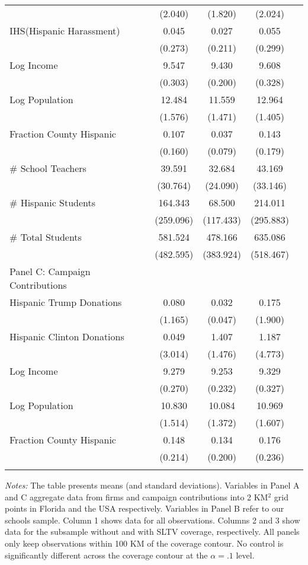 \begin{table}[!h]
{\begin{threeparttable}
\begin{tabular}{l@{\extracolsep{4pt}}cccc}
				 & (2.040) & (1.820) & (2.024) \\
				 IHS(Hispanic Harassment) & 0.045 & 0.027 & 0.055 \\
				 & (0.273) & (0.211) & (0.299) \\
				 Log Income & 9.547 & 9.430 & 9.608 \\
				 & (0.303) & (0.200) & (0.328) \\
				 Log Population & 12.484 & 11.559 & 12.964 \\
				 & (1.576) & (1.471) & (1.405) \\
				 Fraction County Hispanic & 0.107 & 0.037 & 0.143 \\
				 & (0.160) & (0.079) & (0.179) \\
				 \# School Teachers & 39.591 & 32.684 & 43.169 \\
				 & (30.764) & (24.090) & (33.146)\\
				 \# Hispanic Students & 164.343 & 68.500  & 214.011 \\
				 & (259.096) & (117.433) & (295.883) \\
				 \# Total Students & 581.524 & 478.166 & 635.086 \\
				 & (482.595) & (383.924) & (518.467) \\
				\hline\addlinespace
				\hline\addlinespace
				Panel C: Campaign Contributions & \multicolumn{3}{c}{} \\
				\hline\addlinespace
				Hispanic Trump Donations & 0.080 & 0.032 & 0.175 \\
				& (1.165) & (0.047) & (1.900) \\
				Hispanic Clinton Donations & 0.049 & 1.407 & 1.187 \\
				& (3.014) & (1.476) & (4.773)\\
				Log Income & 9.279 & 9.253 & 9.329 \\
				& (0.270) & (0.232) & (0.327) \\
				Log Population & 10.830 & 10.084 & 10.969 \\
				& (1.514) & (1.372) & (1.607) \\
				Fraction County Hispanic & 0.148 & 0.134 & 0.176 \\
				& (0.214) & (0.200) & (0.236) \\
				\hline\addlinespace
				 \hline\addlinespace
			\end{tabular}
			\begin{tablenotes}[flushleft]
				\item \textit{Notes:} The table presents means (and standard deviations). Variables in Panel A and C aggregate data from firms and campaign contributions into 2 KM$^2$ grid points in Florida and the USA respectively. Variables in Panel B refer to our schools sample.  Column 1 shows data for all observations.  Columns 2 and 3 show data for the subsample without and with SLTV coverage, respectively. All panels only keep observations within 100 KM of the coverage contour. No control is significantly different across the coverage contour at the $\alpha = .1$ level.
			\end{tablenotes}
		\end{threeparttable}
	}
\end{table}
